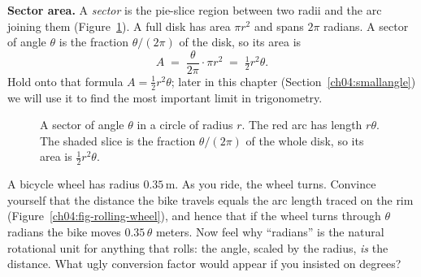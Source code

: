 \textbf{Sector area.} A \emph{sector} is the pie-slice region between two radii and the arc joining them (Figure~\ref{ch04:fig-sector}). A full disk has area $\pi r^2$ and spans $2\pi$ radians. A sector of angle $\theta$ is the fraction $\theta/(2\pi)$ of the disk, so its area is
\[
  A \;=\; \frac{\theta}{2\pi}\cdot \pi r^2 \;=\; \tfrac12 r^2 \theta.
\]
Hold onto that formula $A = \tfrac12 r^2\theta$; later in this chapter (Section~\ref{ch04:smallangle}) we will use it to find the most important limit in trigonometry.

\begin{figure}[htbp]
\centering
{}
\caption{A sector of angle $\theta$ in a circle of radius $r$. The red arc has length $r\theta$. The shaded slice is the fraction $\theta/(2\pi)$ of the whole disk, so its area is $\tfrac12 r^2\theta$.}
\label{ch04:fig-sector}
\end{figure}

\begin{walkbox}
A bicycle wheel has radius $0.35\,\text{m}$. As you ride, the wheel turns. Convince yourself that the distance the bike travels equals the arc length traced on the rim (Figure~\ref{ch04:fig-rolling-wheel}), and hence that if the wheel turns through $\theta$ radians the bike moves $0.35\,\theta$ meters. Now feel why ``radians'' is the natural rotational unit for anything that rolls: the angle, scaled by the radius, \emph{is} the distance. What ugly conversion factor would appear if you insisted on degrees?
\end{walkbox}

